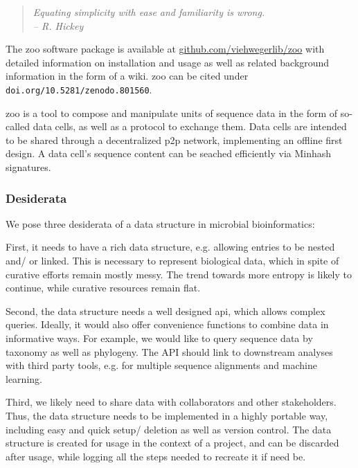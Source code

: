 \vspace{0.5cm}

\begin{quotation}
\emph{Equating simplicity with ease and familiarity is wrong.\\
-- R. Hickey}
\end{quotation}

\vspace{0.5cm}

The zoo software package is available at \hyperlink{https://github.com/viehwegerlib/zoo}{github.com/viehwegerlib/zoo} with detailed information on installation and usage as well as related background information in the form of a wiki. zoo can be cited under \colorbox{red-very-light}{\lstinline{doi.org/10.5281/zenodo.801560}}.

zoo is a tool to compose and manipulate units of sequence data in the form of so-called data cells, as well as a protocol to exchange them. Data cells are intended to be shared through a decentralized \gls{p2p} network, implementing an offline first design. A data cell's sequence content can be seached efficiently via Minhash signatures.


\subsubsection{Desiderata}

We pose three desiderata of a data structure in microbial bioinformatics:

First, it needs to have a rich data structure, e.g. allowing entries to be nested and/ or linked. This is necessary to represent biological data, which in spite of curative efforts remain mostly messy. The trend towards more entropy is likely to continue, while curative resources remain flat.

Second, the data structure needs a well designed \gls{api}, which allows complex queries. Ideally, it would also offer convenience functions to combine data in informative ways. For example, we would like to query sequence data by taxonomy as well as phylogeny. The API should link to downstream analyses with third party tools, e.g. for multiple sequence alignments and machine learning.

Third, we likely need to share data with collaborators and other stakeholders. Thus, the data structure needs to be implemented in a highly portable way, including easy and quick setup/ deletion as well as version control. The data structure is created for usage in the context of a project, and can be discarded after usage, while logging all the steps needed to recreate it if need be.


